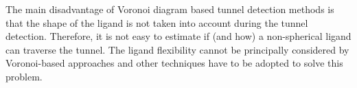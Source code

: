 \documentclass[usletter, 10pt, conference]{ieeeconf} %
\begin{document}
The main disadvantage of Voronoi diagram based tunnel detection methods is that the shape of the ligand is not taken into account during the tunnel detection.
Therefore, it is not easy to estimate if (and how) a non-spherical ligand can traverse the tunnel.
The ligand flexibility cannot be principally considered by Voronoi-based approaches and other techniques have to be adopted to solve this problem.


\end{document}
